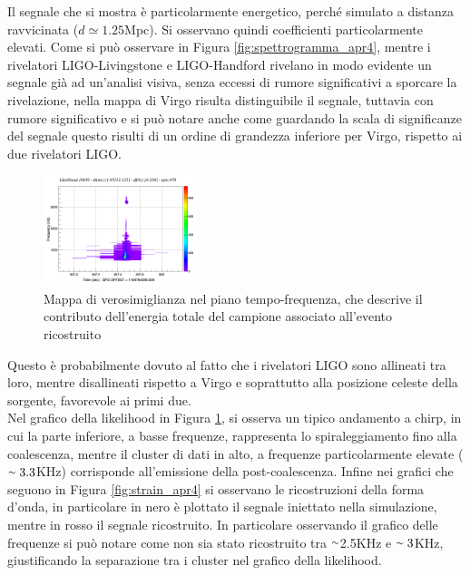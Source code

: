 Il segnale che si mostra è particolarmente energetico, perché simulato a distanza ravvicinata ($d \simeq 1.25$Mpc). Si osservano quindi coefficienti particolarmente elevati.
Come si può osservare in Figura \ref{fig:spettrogramma_apr4}, mentre i rivelatori LIGO-Livingstone e LIGO-Handford rivelano in modo evidente un segnale già ad un'analisi visiva, senza eccessi di rumore significativi a sporcare la rivelazione, nella mappa di Virgo risulta distinguibile il segnale, tuttavia con rumore significativo e si può notare anche come guardando la scala di significanze del segnale questo risulti di un ordine di grandezza inferiore per Virgo, rispetto ai due rivelatori LIGO. 
\begin{figure}
	\vspace{-15pt}
	\begin{center}
		\includegraphics[width=0.4\textwidth]{figures/Capitolo_4/APR4_q09/l_tfmap_scalogram.png}
	\end{center}
	\vspace{-8pt}
	\caption{Mappa di verosimiglianza nel piano tempo-frequenza, che descrive il contributo dell'energia totale del campione associato all'evento ricostruito}
	\label{fig:Likelihood_APR4}
	\vspace{-15pt}
\end{figure}
Questo è probabilmente dovuto al fatto che i rivelatori LIGO sono allineati tra loro, mentre disallineati rispetto a Virgo e soprattutto alla posizione celeste della sorgente, favorevole ai primi due.\\
Nel grafico della likelihood in Figura \ref{fig:Likelihood_APR4}, si osserva un tipico andamento a chirp, in cui la parte inferiore, a basse frequenze, rappresenta lo spiraleggiamento fino alla coalescenza, mentre il cluster di dati in alto, a frequenze particolarmente elevate ($\smallsim 3.3$KHz) corrisponde all'emissione della post-coalescenza.
Infine nei grafici che seguono in Figura \ref{fig:strain_apr4} si osservano le ricostruzioni della forma d'onda, in particolare in nero è plottato il segnale iniettato nella simulazione, mentre in rosso il segnale ricostruito. In particolare osservando il grafico delle frequenze si può notare come non sia stato ricostruito tra $\smallsim$2.5KHz e $\smallsim3$KHz, giustificando la separazione tra i cluster nel grafico della likelihood.
